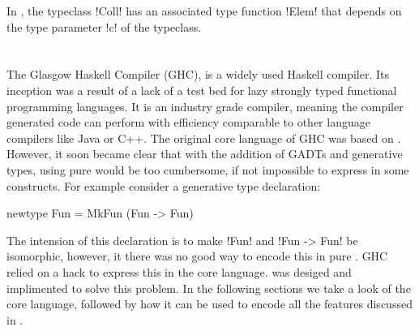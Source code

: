 \documentclass[manuscript,screen,nonacm]{acmart}
\begin{document}
In , the typeclass !Coll! has an associated type function !Elem! that depends on the type parameter !c! of the typeclass.

\section{\SFC}\label{sec:sfc}
The Glasgow Haskell Compiler (GHC)\cite{ghc_2020}, is a widely used Haskell\cite{haskell_2010} compiler. Its inception was a result of a lack of a test bed for lazy strongly typed functional programming languages. It is an industry grade compiler, meaning the compiler generated code can perform with efficiency comparable to other language compilers like Java or C++. The original core language of GHC was based on \SF. However, it soon became clear that with the addition of GADTs and generative types, using pure \SF would be too cumbersome, if not impossible to express in some constructs. For example consider a generative type declaration:

\begin{CenteredBox}
  \begin{code}
    newtype Fun = MkFun (Fun -> Fun)
  \end{code}
\end{CenteredBox}
The intension of this declaration is to make !Fun! and !Fun -> Fun! be isomorphic, however, it there was no good way to encode this in pure \SF. GHC relied on a hack to express this in the core language.
\SFC\cite{sulzmann_system_2007} was desiged and implimented to solve this problem. In the following sections we take a look of the core language, followed by how it can be used to encode all the features discussed in .
\end{document}
